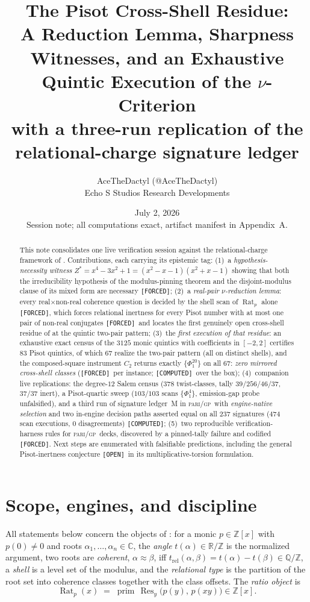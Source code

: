 \documentclass[11pt]{article}
\title{\textbf{The Pisot Cross-Shell Residue:}\\
A Reduction Lemma, Sharpness Witnesses, and an Exhaustive Quintic Execution of the $\nu$-Criterion\\
\large with a three-run replication of the relational-charge signature ledger}
\author{AceTheDactyl (@AceTheDactyl)\\ Echo S Studios Research Developments}
\date{July 2, 2026 \\ \small Session note; all computations exact, artifact manifest in Appendix~A.}
\newcommand{\F}{\textnormal{\texttt{[FORCED]}}}
\newcommand{\C}{\textnormal{\texttt{[COMPUTED]}}}
\newcommand{\Op}{\textnormal{\texttt{[OPEN]}}}
\newcommand{\Q}{\mathbb{Q}}
\newcommand{\Z}{\mathbb{Z}}
\newcommand{\R}{\mathbb{R}}
\newcommand{\Rat}{\operatorname{Rat}}
\newcommand{\Res}{\operatorname{Res}}
\newcommand{\gp}{\textsc{pari/gp}}
\theoremstyle{definition}
\begin{document}
\maketitle

\begin{abstract}
This note consolidates one live verification session against the relational-charge
framework of \cite{relcharge}. Contributions, each carrying its epistemic tag:
(1)~a \emph{hypothesis-necessity witness} $Z^{*}=x^4-3x^2+1=(x^2-x-1)(x^2+x-1)$
showing that both the irreducibility hypothesis of the modulus-pinning theorem and
the disjoint-modulus clause of its mixed form are necessary \F;
(2)~a \emph{real-pair $\nu$-reduction lemma}: every real$\times$non-real coherence
question is decided by the shell scan of $\Rat_p$ alone \F, which forces relational
inertness for every Pisot number with at most one pair of non-real conjugates \F\
and locates the first genuinely open cross-shell residue of \cite[Cor.~7.16]{relcharge}
at the quintic two-pair pattern;
(3)~the \emph{first execution of that residue}: an exhaustive exact census of the
$3125$ monic quintics with coefficients in $[-2,2]$ certifies $83$ Pisot quintics,
of which $67$ realize the two-pair pattern (all on distinct shells), and the
composed-square instrument $C_2$ returns exactly $\{\Phi_1^{20}\}$ on all $67$:
\emph{zero mirrored cross-shell classes} (\F\ per instance; \C\ over the box);
(4)~companion live replications: the degree-$12$ Salem census
($378$ twist-classes, tally $39/256/46/37$, $37/37$ inert), a Pisot-quartic sweep
($103/103$ scans $\{\Phi_1^4\}$, emission-gap probe unfalsified), and a third run
of signature ledger~M in \gp\ with \emph{engine-native selection} and two
in-engine decision paths asserted equal on all $237$ signatures ($474$ scan
executions, $0$ disagreements) \C;
(5)~two reproducible verification-harness rules for \gp\ decks, discovered by a
pinned-tally failure and codified \F.
Next steps are enumerated with falsifiable predictions, including the general
Pisot-inertness conjecture \Op\ in its multiplicative-torsion formulation.
\end{abstract}

\section{Scope, engines, and discipline}\label{sec:scope}

All statements below concern the objects of \cite{relcharge}: for a monic
$p\in\Z[x]$ with $p(0)\neq 0$ and roots $\alpha_1,\dots,\alpha_n\in\mathbb{C}$,
the \emph{angle} $t(\alpha)\in\R/\Z$ is the normalized argument, two roots are
\emph{coherent}, $\alpha\approx\beta$, iff
$t_{\mathrm{rel}}(\alpha,\beta)=t(\alpha)-t(\beta)\in\Q/\Z$, a \emph{shell} is a
level set of the modulus, and the \emph{relational type} is the partition of the
root set into coherence classes together with the class offsets. The
\emph{ratio object} is
\[
\Rat_p(x)\;=\;\operatorname{prim}\,\Res_y\bigl(p(y),\,p(xy)\bigr)\in\Z[x].
\]
\end{document}

